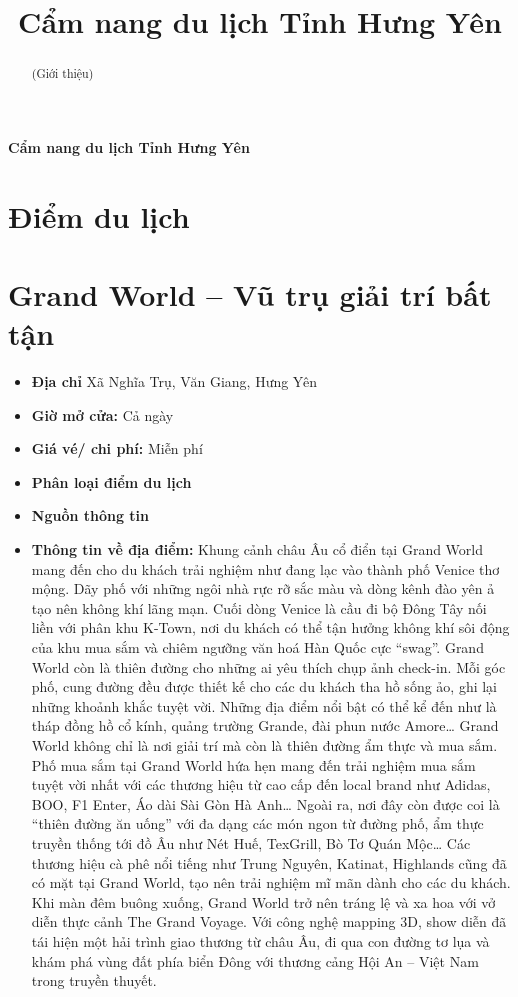 \documentclass{article}
\title{Cẩm nang du lịch Tỉnh Hưng Yên}
\begin{document}
\begin{center}
    \fontsize{18}{20}\textbf{Cẩm nang du lịch Tỉnh Hưng Yên}
\end{center}
\begin{abstract}
    (Giới thiệu)
\end{abstract}
\section*{Điểm du lịch}

\section{Grand World – Vũ trụ giải trí bất tận}
\begin{itemize}
    \item{\textbf{Địa chỉ}} Xã Nghĩa Trụ, Văn Giang, Hưng Yên

    \item{\textbf{Giờ mở cửa:}} Cả ngày

    \item{\textbf{Giá vé/ chi phí:}} Miễn phí

    \item{\textbf{Phân loại điểm du lịch}}

    \item{\textbf{Nguồn thông tin}}

    \item{\textbf{Thông tin về địa điểm:}} Khung cảnh châu Âu cổ điển tại Grand World mang đến cho du khách trải nghiệm như đang lạc vào thành phố Venice thơ mộng. Dãy phố với những ngôi nhà rực rỡ sắc màu và dòng kênh đào yên ả tạo nên không khí lãng mạn. Cuối dòng Venice là cầu đi bộ Đông Tây nối liền với phân khu K-Town, nơi du khách có thể tận hưởng không khí sôi động của khu mua sắm và chiêm ngưỡng văn hoá Hàn Quốc cực “swag”. Grand World còn là thiên đường cho những ai yêu thích chụp ảnh check-in. Mỗi góc phố, cung đường đều được thiết kế cho các du khách tha hồ sống ảo, ghi lại những khoảnh khắc tuyệt vời. Những địa điểm nổi bật có thể kể đến như là tháp đồng hồ cổ kính, quảng trường Grande, đài phun nước Amore… Grand World không chỉ là nơi giải trí mà còn là thiên đường ẩm thực và mua sắm. Phố mua sắm tại Grand World hứa hẹn mang đến trải nghiệm mua sắm tuyệt vời nhất với các thương hiệu từ cao cấp đến local brand như Adidas, BOO, F1 Enter, Áo dài Sài Gòn Hà Anh… Ngoài ra, nơi đây còn được coi là “thiên đường ăn uống” với đa dạng các món ngon từ đường phố, ẩm thực truyền thống tới đồ Âu như Nét Huế, TexGrill, Bò Tơ Quán Mộc… Các thương hiệu cà phê nổi tiếng như Trung Nguyên, Katinat, Highlands cũng đã có mặt tại Grand World, tạo nên trải nghiệm mĩ mãn dành cho các du khách. Khi màn đêm buông xuống, Grand World trở nên tráng lệ và xa hoa với vở diễn thực cảnh The Grand Voyage. Với công nghệ mapping 3D, show diễn đã tái hiện một hải trình giao thương từ châu Âu, đi qua con đường tơ lụa và khám phá vùng đất phía biển Đông với thương cảng Hội An – Việt Nam trong truyền thuyết.
\end{itemize}
\end{document}
